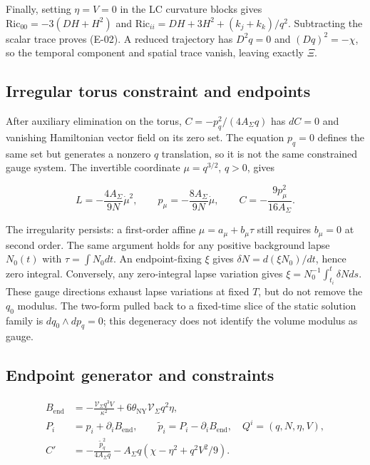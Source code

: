 Finally, setting $\eta=V=0$ in the LC curvature blocks gives $\mathrm{Ric}_{00}=-3(DH+H^2)$ and $\mathrm{Ric}_{ii}=DH+3H^2+(k_j+k_k)/q^2$. Subtracting the scalar trace proves (E-02). A reduced trajectory has $D^2q=0$ and $(Dq)^2=-\chi$, so the temporal component and spatial trace vanish, leaving exactly $\Xi$.

\subsection{Irregular torus constraint and endpoints}

After auxiliary elimination on the torus, $C=-p_q^2/(4A_{\Sigma}q)$ has $dC=0$ and vanishing Hamiltonian vector field on its zero set. The equation $p_q=0$ defines the same set but generates a nonzero $q$ translation, so it is not the same constrained gauge system. The invertible coordinate $\mu=q^{3/2}$, $q>0$, gives

\begin{equation}\tag{H-07}\label{eq:H-07}
L=-\frac{4A_{\Sigma}}{9N}\dot\mu^2,\qquad p_\mu=-\frac{8A_{\Sigma}}{9N}\dot\mu,\qquad C=-\frac{9p_\mu^2}{16A_{\Sigma}}.
\end{equation}

The irregularity persists: a first-order affine $\mu=a_\mu+b_\mu\tau$ still requires $b_\mu=0$ at second order. The same argument holds for any positive background lapse $N_0(t)$ with $\tau=\int N_0dt$. An endpoint-fixing $\xi$ gives $\delta N=d(\xi N_0)/dt$, hence zero integral. Conversely, any zero-integral lapse variation gives $\xi=N_0^{-1}\int_{t_i}^t\delta Nds$. These gauge directions exhaust lapse variations at fixed $T$, but do not remove the $q_0$ modulus. The two-form pulled back to a fixed-time slice of the static solution family is $dq_0\wedge dp_q=0$; this degeneracy does not identify the volume modulus as gauge.

\subsection{Endpoint generator and constraints}

\begin{equation}\tag{K-01}\label{eq:K-01}
\begin{aligned}
B_{\mathrm{end}}&=-\frac{\mathcal V_{\Sigma}q^3V}{\kappa^2}
 +6\theta_{\mathrm{NY}}\mathcal V_{\Sigma}q^2\eta,\\
P_i&=p_i+\partial_iB_{\mathrm{end}},\qquad
\widetilde p_i=P_i-\partial_iB_{\mathrm{end}},\quad Q^i=(q,N,\eta,V),\\
C'&=-\frac{\widetilde p_q^2}{4A_{\Sigma}q}
 -A_{\Sigma}q(\chi-\eta^2+q^2V^2/9).
\end{aligned}
\end{equation}

